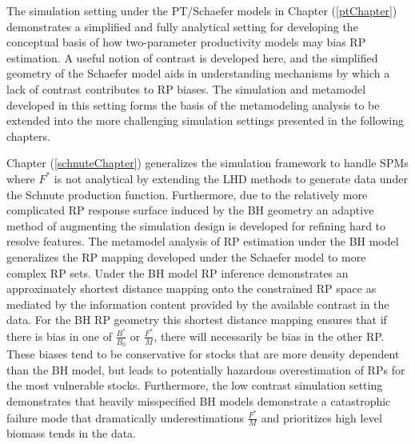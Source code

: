 \documentclass[12pt]{ucscthesis}
\begin{document}
%
The simulation setting under the PT/Schaefer models in Chapter (\ref{ptChapter}) 
demonstrates a simplified and fully analytical setting for developing the 
conceptual basis of how two-parameter productivity models may bias RP estimation. 
A useful notion of contrast is developed here, and the simplified geometry of the 
Schaefer model aids in understanding mechanisms by which a lack of contrast 
contributes to RP biases.
The simulation and metamodel developed in this setting forms the basis of the 
metamodeling analysis to be extended into the more challenging simulation settings 
presented in the following chapters.


%
Chapter (\ref{schnuteChapter}) generalizes the simulation framework to handle 
SPMs where $F^*$ is not analytical by extending the LHD methods to generate data 
under the Schnute production function. Furthermore, due to the relatively more 
complicated RP response surface induced by the BH geometry an adaptive method of 
augmenting the simulation design is developed for refining hard to resolve features. 
The metamodel analysis of RP estimation under the BH model generalizes the RP 
mapping developed under the Schaefer model to more complex RP sets. Under the 
BH model RP inference demonstrates an approximately shortest distance mapping 
onto the constrained RP space as mediated by the information content provided 
by the available contrast in the data. For the BH RP geometry this shortest 
distance mapping ensures that if there is bias in one of $\frac{B^*}{B_0}$ or 
$\frac{F^*}{M}$, there will necessarily be bias in the other RP. These biases 
tend to be conservative for stocks that are more density dependent than the 
BH model, but leads to potentially hazardous overestimation of RPs for the most 
vulnerable stocks. Furthermore, the low contrast simulation setting 
demonstrates that heavily misspecified BH models demonstrate a catastrophic 
failure mode that dramatically underestimations $\frac{F^*}{M}$ and 
prioritizes high level biomass tends in the data. 
\end{document}
